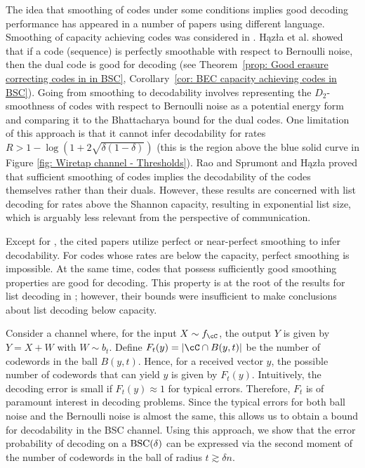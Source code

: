 \documentclass{amsart}
\theoremstyle{remark}
\begin{document}
The idea that smoothing of codes under some conditions implies good decoding performance has appeared in a number of papers using different language. Smoothing of capacity achieving codes was considered in \cite{shamai1997empirical,polyanskiy2013empirical}. H{\k a}z\l{}a et al. \cite{hkazla2021codes} showed that if a code (sequence) is perfectly smoothable with respect to Bernoulli noise, then the dual code is good for decoding (see Theorem~\ref{prop: Good erasure correcting codes in in BSC}, Corollary~\ref{cor: BEC capacity achieving codes in BSC}).
Going from smoothing to decodability involves representing the $D_2$-smoothness of codes with respect to Bernoulli noise as a potential energy form and comparing it to the Bhattacharya bound for the dual codes. One limitation of this approach is that it cannot infer decodability for rates $R > 1-\log(1+2\sqrt{\delta(1-\delta)})$ (this is the region above the blue solid curve in Figure \ref{fig: Wiretap channel - Thresholds}). Rao and Sprumont \cite{rao2022criterion} and H{\k a}z\l{}a \cite{hkazla2022optimal} proved that sufficient smoothing of codes implies the decodability of the codes themselves rather than their duals. However, these results are concerned with list decoding for rates above the Shannon capacity, resulting in exponential list size, which is arguably less relevant from the perspective of communication. 

Except for \cite{rao2022criterion}, the cited papers utilize  perfect or near-perfect smoothing to infer decodability.  For codes whose rates are below the capacity, perfect smoothing is impossible. At the same time, codes that possess sufficiently good smoothing properties are good for decoding. This property is at the root of the results for list decoding in  \cite{rao2022criterion}; however, their bounds were insufficient to make conclusions about list decoding below capacity.

Consider a channel where, for the input $X \sim f_{\cC}$, the output $Y$ is given by $Y = X + W$ with $W \sim b_t$. Define $F_t(y) = |\cC \cap B(y,t)|$ be the number of codewords in the ball $B(y,t)$. Hence, for a received vector $y$, the possible number of codewords that can yield $y$ is given by $F_t(y)$. Intuitively, the decoding error is small if $F_t(y) \approx 1$ for typical errors. Therefore, $F_t$ is of paramount interest in decoding problems. Since the typical errors for both ball noise and the Bernoulli noise is almost the same, this allows us to obtain a bound for decodability in the BSC channel.
Using this approach, we show that the error probability of decoding
on a ${\text{\rm BSC}}(\delta)$ can be expressed via the second moment of the number of codewords in 
the ball of radius $ t \gtrsim \delta n $.
\end{document}

